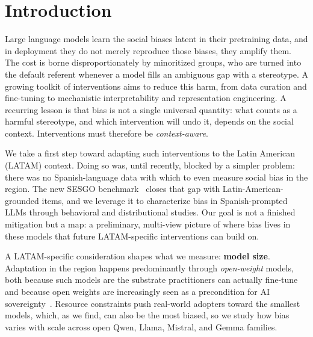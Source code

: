 \section{Introduction}
\label{sec:intro}

Large language models learn the social biases latent in their pretraining data, and in
deployment they do not merely reproduce those biases, they amplify them. The cost is
borne disproportionately by minoritized groups, who are turned into the default
referent whenever a model fills an ambiguous gap with a stereotype. A growing toolkit
of interventions aims to reduce this harm, from data curation and fine-tuning to
mechanistic interpretability and representation engineering. A recurring lesson is that
bias is not a single universal quantity: what counts as a harmful stereotype, and which
intervention will undo it, depends on the social context. Interventions must therefore
be \emph{context-aware}.

We take a first step toward adapting such interventions to the Latin American (LATAM)
context. Doing so was, until recently, blocked by a simpler problem: there was no
Spanish-language data with which to even measure social bias in the region. The new
\textsc{SESGO} benchmark~\citep{robles2025sesgo} closes that gap with
Latin-American-grounded items, and we leverage it to characterize bias in
Spanish-prompted LLMs through behavioral and distributional studies. Our
goal is not a finished mitigation but a map: a preliminary, multi-view picture of where
bias lives in these models that future LATAM-specific interventions can build on.

A LATAM-specific consideration shapes what we measure: \textbf{model size}. Adaptation
in the region happens predominantly through \emph{open-weight} models, both because such
models are the substrate practitioners can actually fine-tune and because open weights
are increasingly seen as a precondition for AI sovereignty~\citep{sovereignty}.
Resource constraints push real-world adopters toward the smallest models, which, as we
find, can also be the most biased, so we study how bias varies with scale across open
Qwen, Llama, Mistral, and Gemma families.

